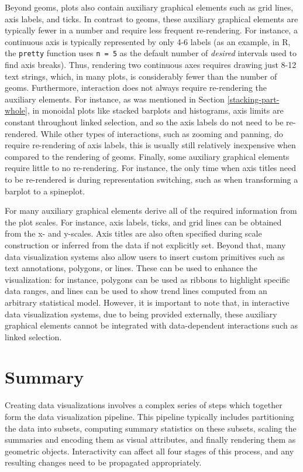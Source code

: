 \documentclass[
  openany]{book}
\theoremstyle{definition}
\theoremstyle{definition}
\theoremstyle{definition}
\theoremstyle{definition}
\theoremstyle{remark}
\begin{document}
Beyond geoms, plots also contain auxiliary graphical elements such as grid lines, axis labels, and ticks. In contrast to geoms, these auxiliary graphical elements are typically fewer in a number and require less frequent re-rendering. For instance, a continuous axis is typically represented by only 4-6 labels (as an example, in R, the \texttt{pretty} function uses \texttt{n\ =\ 5} as the default number of \emph{desired} intervals used to find axis breaks). Thus, rendering two continuous axes requires drawing just 8-12 text strings, which, in many plots, is considerably fewer than the number of geoms. Furthermore, interaction does not always require re-rendering the auxiliary elements. For instance, as was mentioned in Section \ref{stacking-part-whole}, in monoidal plots like stacked barplots and histograms, axis limits are constant throughout linked selection, and so the axis labels do not need to be re-rendered. While other types of interactions, such as zooming and panning, do require re-rendering of axis labels, this is usually still relatively inexpensive when compared to the rendering of geoms. Finally, some auxiliary graphical elements require little to no re-rendering. For instance, the only time when axis titles need to be re-rendered is during representation switching, such as when transforming a barplot to a spineplot.

For many auxiliary graphical elements derive all of the required information from the plot scales. For instance, axis labels, ticks, and grid lines can be obtained from the x- and y-scales. Axis titles are also often specified during scale construction or inferred from the data if not explicitly set. Beyond that, many data visualization systems also allow users to insert custom primitives such as text annotations, polygons, or lines. These can be used to enhance the visualization: for instance, polygons can be used as ribbons to highlight specific data ranges, and lines can be used to show trend lines computed from an arbitrary statistical model. However, it is important to note that, in interactive data visualization systems, due to being provided externally, these auxiliary graphical elements cannot be integrated with data-dependent interactions such as linked selection.

\section{Summary}\label{summary-1}

Creating data visualizations involves a complex series of steps which together form the data visualization pipeline. This pipeline typically includes partitioning the data into subsets, computing summary statistics on these subsets, scaling the summaries and encoding them as visual attributes, and finally rendering them as geometric objects. Interactivity can affect all four stages of this process, and any resulting changes need to be propagated appropriately.
\end{document}
